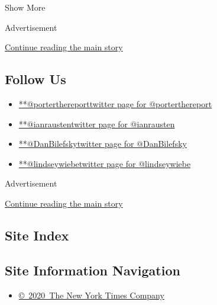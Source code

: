 Show More

Advertisement

\protect\hyperlink{after-mid1}{Continue reading the main story}

\hypertarget{follow-us}{%
\subsection{Follow Us}\label{follow-us}}

\begin{itemize}
\tightlist
\item
  \href{https://twitter.com/porterthereport}{**@porterthereporttwitter
  page for @porterthereport}
\item
  \href{https://twitter.com/ianrausten}{**@ianraustentwitter page for
  @ianrausten}
\item
  \href{https://twitter.com/DanBilefsky}{**@DanBilefskytwitter page for
  @DanBilefsky}
\item
  \href{https://twitter.com/lindseywiebe}{**@lindseywiebetwitter page
  for @lindseywiebe}
\end{itemize}

Advertisement

\protect\hyperlink{after-mktg}{Continue reading the main story}

\hypertarget{site-index}{%
\subsection{Site Index}\label{site-index}}

\hypertarget{site-information-navigation}{%
\subsection{Site Information
Navigation}\label{site-information-navigation}}

\begin{itemize}
\tightlist
\item
  \href{https://help.nytimes3xbfgragh.onion/hc/en-us/articles/115014792127-Copyright-notice}{©~2020~The
  New York Times Company}
\end{itemize}

